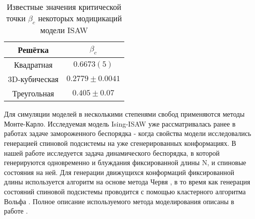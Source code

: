 \begin{table}[h]
    \centering
    \begin{tabular}{|c|c|}
        \hline
        Решётка & $\beta_{c}$ \\ \hline
        Квадратная & $0.6673(5)$ \cite{caracciolo2011geometrical} \\ \hline
        3D-кубическая & $0.2779 \pm 0.0041$\cite{Tesi1996} \\ \hline
        Треугольная & $ 0.405 \pm 0.07$\cite{Privman1986} \\ \hline
    \end{tabular}
    \caption{Известные значения критической точки $\beta_c$ некоторых модицикаций модели ISAW}
    \label{tab:ISAW_T_c}
\end{table}

Для симуляции моделей в несколькими степенями свобод применяются методы Монте-Карло.
Исследуемая модель Ising-ISAW уже рассматривалась ранее в работах \cite{Garel1999, Papale2018} задаче замороженного беспорядка - когда свойства модели исследовались генерацией спиновой подсистемы на уже сгенерированных конформациях.
В нашей работе исследуется задача динамического беспорядка, в которой генерируются одновременно и блуждания фиксированной длины N, и спиновые состояния на ней.
Для генерации движущихся конформаций фиксированной длины используется алгоритм на основе метода Червя \cite{Worm}, 
в то время как генерация состояний спиновой подсистемы проводится с помощью кластерного алгоритма Вольфа \cite{Wolff}.
Полное описание используемого метода моделирования описаны в работе \cite{faizullina2021critical}.
